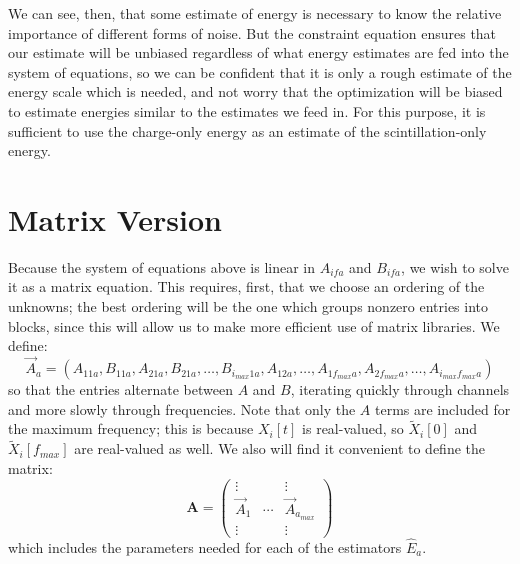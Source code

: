 We can see, then, that some estimate of energy is necessary to know the relative importance of different forms of noise.  But the constraint equation ensures that our estimate will be unbiased regardless of what energy estimates are fed into the system of equations, so we can be confident that it is only a rough estimate of the energy scale which is needed, and not worry that the optimization will be biased to estimate energies similar to the estimates we feed in.  For this purpose, it is sufficient to use the charge-only energy as an estimate of the scintillation-only energy.

\section{Matrix Version}

Because the system of equations above is linear in $A_{ifa}$ and $B_{ifa}$, we wish to solve it as a matrix equation.  This requires, first, that we choose an ordering of the unknowns; the best ordering will be the one which groups nonzero entries into blocks, since this will allow us to make more efficient use of matrix libraries.  We define:
\begin{equation}
\vec{A}_a = (A_{1 1 a}, B_{1 1 a}, A_{2 1 a}, B_{2 1 a}, \dots, B_{i_{max} 1 a}, A_{1 2 a}, \dots, A_{1 f_{max} a}, A_{2 f_{max} a}, \dots, A_{i_{max} f_{max} a})
\end{equation}
so that the entries alternate between $A$ and $B$, iterating quickly through channels and more slowly through frequencies.  Note that only the $A$ terms are included for the maximum frequency; this is because $X_i[t]$ is real-valued, so $\widetilde{X}_i[0]$ and $\widetilde{X}_i[f_{max}]$ are real-valued as well.  We also will find it convenient to define the matrix:
\begin{equation}
\mathbf{A} = \begin{pmatrix}
\vdots & & \vdots \\
\vec{A}_1 & \cdots & \vec{A}_{a_{max}} \\
\vdots & & \vdots
\end{pmatrix}
\end{equation}
which includes the parameters needed for each of the estimators $\widehat{E}_a$.

